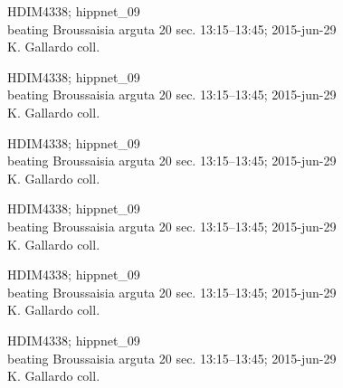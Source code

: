 \documentclass[2pt]{extarticle}
\begin{document}
\noindent
\parbox{0.16\textwidth}{\tiny \raggedright \rule[-0.3\baselineskip]{0pt}{10pt}HDIM4338; hippnet\_09\\ beating Broussaisia arguta 20 sec. 13:15--13:45; 2015-jun-29\\ K. Gallardo coll.}
\parbox{0.16\textwidth}{\tiny \raggedright \rule[-0.3\baselineskip]{0pt}{10pt}HDIM4338; hippnet\_09\\ beating Broussaisia arguta 20 sec. 13:15--13:45; 2015-jun-29\\ K. Gallardo coll.}
\parbox{0.16\textwidth}{\tiny \raggedright \rule[-0.3\baselineskip]{0pt}{10pt}HDIM4338; hippnet\_09\\ beating Broussaisia arguta 20 sec. 13:15--13:45; 2015-jun-29\\ K. Gallardo coll.}
\parbox{0.16\textwidth}{\tiny \raggedright \rule[-0.3\baselineskip]{0pt}{10pt}HDIM4338; hippnet\_09\\ beating Broussaisia arguta 20 sec. 13:15--13:45; 2015-jun-29\\ K. Gallardo coll.}
\parbox{0.16\textwidth}{\tiny \raggedright \rule[-0.3\baselineskip]{0pt}{10pt}HDIM4338; hippnet\_09\\ beating Broussaisia arguta 20 sec. 13:15--13:45; 2015-jun-29\\ K. Gallardo coll.}
\parbox{0.16\textwidth}{\tiny \raggedright \rule[-0.3\baselineskip]{0pt}{10pt}HDIM4338; hippnet\_09\\ beating Broussaisia arguta 20 sec. 13:15--13:45; 2015-jun-29\\ K. Gallardo coll.} \\ 
\vspace{0.001in} 
\end{document}
